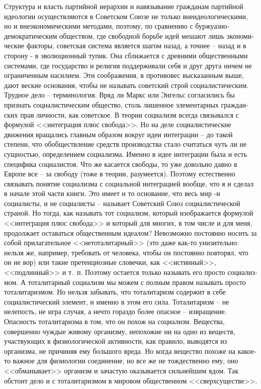 \documentclass{book}
\begin{document}
Структура и власть партийной иерархии и навязывание граж­данам партийной идеологии осуществляются в Советском Союзе не только внеидеологическими, но и внеэкономическими мето­дами, поэтому, по сравнению с буржуазно-демократическим обществом, где свободной борьбе идей мешают лишь экономи­ческие факторы, советская система является шагом назад, а точнее -- назад и в сторону - в эволюционный тупик. Она сбли­жается с древними общественными системами, где государст­во и религия поддерживали себя и друг друга ничем не огра­ниченным насилием. Эти соображения, в противовес высказан­ным выше, дают веские основания, чтобы не называть совет­ский строй социалистическим. Трудное дело -- терминология. Вряд ли Маркс или Энгельс согласились бы признать социали­стическим общество, столь лишенное элементарных граждан­ских прав личности, как советское. В теории социализм всегда связывался с формулой <<интеграция плюс свобода>>. Но на де­ле социалистические движения вращались главным образом вокруг идеи интеграции -- до такой 
степени, что обобществле­ние средств производства стало считаться чуть ли не сущностью, определением социализма. Именно в идее интеграции была и есть специфика социалистов. Что же касается свободы, то уже довольно давно в Европе все -- за свободу (тоже в теории, разумеется). Поэтому естественно связывать понятие социализма с социальной интеграцией вообще, что я и сделал в нача­ле этой части книги. Это имеет и то основание, что весь мир -и социалисты, и не социалисты -- называет Советский Союз социалистической страной. Но тогда, как называть тот социа­лизм, который изображается формулой <<интеграция плюс сво­бода>> и который для многих, в том числе и для меня, продол­жает оставаться общественным идеалом? Невозможно постоян­но носить за собой прилагательное <<нетоталитарный>> (это да­же как-то унизительно: нельзя же, например, требовать от че­ловека, чтобы он постоянно повторял, что он не вор) или та­кие претенциозные словечки, как <<истинный>>, <<подлинный>> и т.~п. Поэтому остается только называть его просто 
социализ­мом. А тоталитарный социализм мы можем с полным правом называть просто тоталитаризмом. Но нельзя забывать, что тоталитаризм содержит в себе социалистический элемент, и именно в этом его сила. Тоталитаризм -- не нелепость, не игра случая, а нечто гораздо более опасное -- извращение. Опасность тоталитаризма в том, что он похож на социализм.  Вещества, совершенно чуждые живому организму, непохожие ни на одно из веществ, участвующих в физиологической активности, как правило, выводятся из организма, не причиняя ему большого вреда. Но когда вещество похоже на какое-то важное для фи­зиологии соединение, но все же не тождественно ему, оно <<об­манывает>> организм и зачастую оказывается сильнейшим ядом. Так обстоит дело и с тоталитаризмом в мировом общественном <<сверхсуществе>>.
\end{document}
